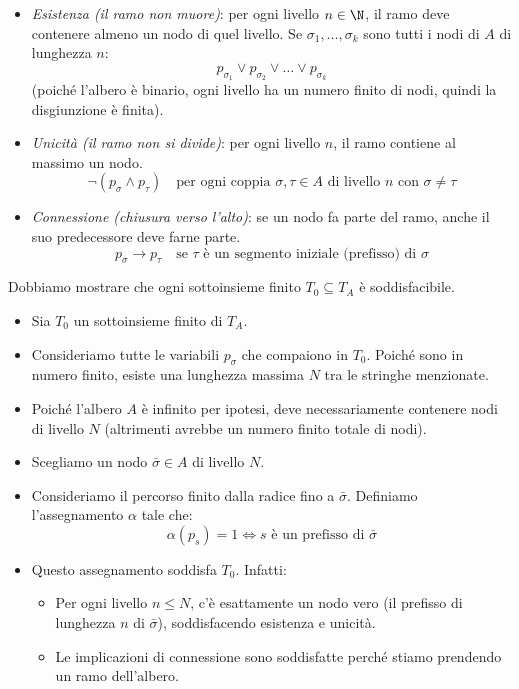\documentclass[a4paper,11pt]{report}
\begin{document}
\begin{itemize}
    \item \textit{Esistenza (il ramo non muore)}: per ogni livello \( n \in \N \), il ramo deve contenere almeno un nodo di quel livello. Se \( \sigma_1, \dots, \sigma_k \) sono tutti i nodi di \( A \) di lunghezza \( n \):
    \[ p_{\sigma_1} \lor p_{\sigma_2} \lor \dots \lor p_{\sigma_k} \]
    (poiché l'albero è binario, ogni livello ha un numero finito di nodi, quindi la disgiunzione è finita).
    
    \item \textit{Unicità (il ramo non si divide)}: per ogni livello \( n \), il ramo contiene al massimo un nodo.
    \[ \neg(p_\sigma \land p_\tau) \quad \text{per ogni coppia } \sigma, \tau \in A \text{ di livello } n \text{ con } \sigma \neq \tau \]
    
    \item \textit{Connessione (chiusura verso l'alto)}: se un nodo fa parte del ramo, anche il suo predecessore deve farne parte.
    \[ p_\sigma \to p_\tau \quad \text{se } \tau \text{ è un segmento iniziale (prefisso) di } \sigma \]
\end{itemize}

Dobbiamo mostrare che ogni sottoinsieme finito \( T_0 \subseteq T_A \) è soddisfacibile.

\begin{itemize}
    \item Sia \( T_0 \) un sottoinsieme finito di \( T_A \).
    \item Consideriamo tutte le variabili \( p_\sigma \) che compaiono in \( T_0 \). Poiché sono in numero finito, esiste una lunghezza massima \( N \) tra le stringhe menzionate.
    \item Poiché l'albero \( A \) è infinito per ipotesi, deve necessariamente contenere nodi di livello \( N \) (altrimenti avrebbe un numero finito totale di nodi).
    \item Scegliamo un nodo \( \bar{\sigma} \in A \) di livello \( N \).
    \item Consideriamo il percorso finito dalla radice fino a \( \bar{\sigma} \). Definiamo l'assegnamento \( \alpha \) tale che:
    \[ \alpha(p_s) = 1 \iff s \text{ è un prefisso di } \bar{\sigma} \]
    \item Questo assegnamento soddisfa \( T_0 \). Infatti:
        \begin{itemize}
            \item Per ogni livello \( n \le N \), c'è esattamente un nodo vero (il prefisso di lunghezza \( n \) di \( \bar{\sigma} \)), soddisfacendo esistenza e unicità.
            \item Le implicazioni di connessione sono soddisfatte perché stiamo prendendo un ramo dell'albero.
        \end{itemize}
\end{itemize}
\end{document}
